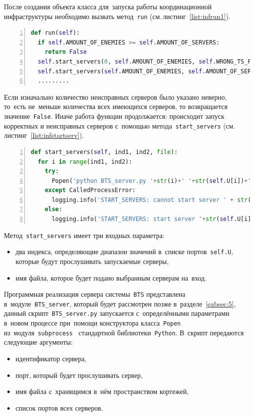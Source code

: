 После создания объекта класса для~запуска работы координационной инфраструктуры необходимо вызвать метод~\texttt{run} (см.\,листинг~\ref{list:infrun1}).
\begin{ListingEnv}\caption{Модуль~\texttt{BTS\_infrastructure}, метод~\texttt{run}}\label{list:infrun1}
\begin{lstlisting}[language=Python, numbers=left]
def run(self):
  if self.AMOUNT_OF_ENEMIES >= self.AMOUNT_OF_SERVERS:
    return False
  self.start_servers(0, self.AMOUNT_OF_ENEMIES, self.WRONG_TS_FILE)
  self.start_servers(self.AMOUNT_OF_ENEMIES, self.AMOUNT_OF_SERVERS, self.TS_FILE)
  .........
	\end{lstlisting}
\end{ListingEnv}
Если изначально количество неисправных серверов было указано неверно, то~есть не~меньше количества всех имеющихся серверов, то возвращается значение~\texttt{False}. Иначе работа функции продолжается: происходит запуск корректных и неисправных серверов с~помощью метода~\texttt{start_servers} (см.\,листинг~\ref{list:infstartserv}).
\begin{ListingEnv}\caption{Модуль~\texttt{BTS\_infrastructure}, метод~\texttt{start\_servers}}\label{list:infstartserv}
	\begin{lstlisting}[language=Python, numbers=left]
def start_servers(self, ind1, ind2, file):
  for i in range(ind1, ind2):
    try:
      Popen('python BTS_server.py '+str(i)+' '+str(self.U[i])+' '+str(file)+' '+''.join(str(j)+' ' for j in self.U), stdout=PIPE, stderr=PIPE, shell=True)
    except CalledProcessError:
      logging.info('START_SERVERS: cannot start server ' + str(self.U[i]))
    else:
      logging.info('START_SERVERS: start server '+str(self.U[i]))
	\end{lstlisting}
\end{ListingEnv}
Метод~\texttt{start_servers} имеет три входных параметра:
\begin{itemize}
	\item два индекса, определяющие диапазон значений в~списке портов~\texttt{self.U}, которые будут прослушивать запускаемые серверы,
	\item имя файла, которое будет подано выбранным серверам на~вход.
\end{itemize}
Программная реализация сервера системы~\texttt{BTS} представлена в~модуле~\texttt{BTS_server}, который будет рассмотрен позже в~разделе~\ref{subsec:5}, данный скрипт~\texttt{BTS_server.py} запускается с~определёнными параметрами в~новом процессе при~помощи конструктора класса~\texttt{Popen} из~модуля~\texttt{subprocess}~\autocite{subprocess} стандартной библиотеки~\texttt{Python}. В~скрипт передаются следующие аргументы:
\begin{itemize}
	\item идентификатор сервера,
	\item порт, который будет прослушивать сервер,
	\item имя файла с~хранящимся в~нём пространством кортежей,
	\item список портов всех серверов.
\end{itemize}


